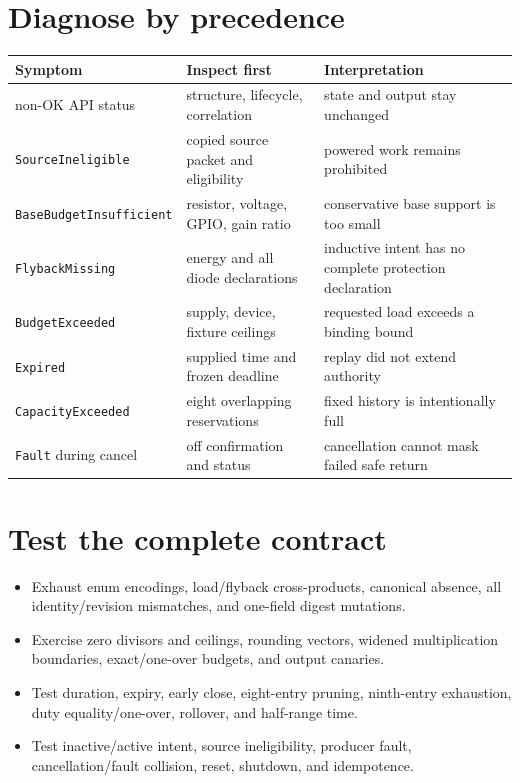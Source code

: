 \documentclass[10pt]{article}
\begin{document}
\section{Diagnose by precedence}
\begin{tabularx}{\linewidth}{@{}l X X@{}}
\toprule
Symptom & Inspect first & Interpretation\\
\midrule
non-OK API status & structure, lifecycle, correlation & state and output stay unchanged\\
\texttt{SourceIneligible} & copied source packet and eligibility & powered work remains prohibited\\
\texttt{BaseBudgetInsufficient} & resistor, voltage, GPIO, gain ratio & conservative base support is too small\\
\texttt{FlybackMissing} & energy and all diode declarations & inductive intent has no complete protection declaration\\
\texttt{BudgetExceeded} & supply, device, fixture ceilings & requested load exceeds a binding bound\\
\texttt{Expired} & supplied time and frozen deadline & replay did not extend authority\\
\texttt{CapacityExceeded} & eight overlapping reservations & fixed history is intentionally full\\
\texttt{Fault} during cancel & off confirmation and status & cancellation cannot mask failed safe return\\
\bottomrule
\end{tabularx}

\section{Test the complete contract}
\begin{itemize}
 \item Exhaust enum encodings, load/flyback cross-products, canonical absence,
       all identity/revision mismatches, and one-field digest mutations.
 \item Exercise zero divisors and ceilings, rounding vectors, widened
       multiplication boundaries, exact/one-over budgets, and output canaries.
 \item Test duration, expiry, early close, eight-entry pruning, ninth-entry
       exhaustion, duty equality/one-over, rollover, and half-range time.
 \item Test inactive/active intent, source ineligibility, producer fault,
       cancellation/fault collision, reset, shutdown, and idempotence.
\end{itemize}
\end{document}
